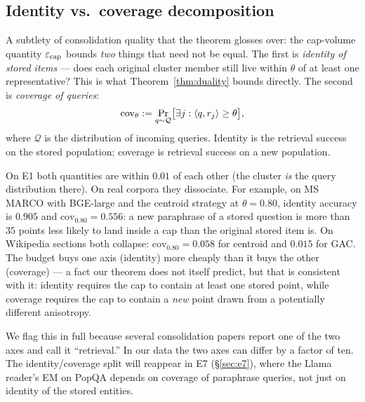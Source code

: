 \subsection{Identity vs.\ coverage decomposition}
\label{sec:identity_coverage}

A subtlety of consolidation quality that the theorem glosses over: the
cap-volume quantity $\varepsilon_{\mathrm{cap}}$ bounds \emph{two} things that
need not be equal. The first is \emph{identity of stored items} --- does
each original cluster member still live within $\theta$ of at least one
representative? This is what Theorem~\ref{thm:duality} bounds directly.
The second is \emph{coverage of queries}:
\begin{equation}
\mathrm{cov}_\theta := \Pr_{q \sim \mathcal{Q}}
\bigl[\exists j : \left\langle q,r_j\right\rangle \geq \theta\bigr],
\label{eq:coverage_def}
\end{equation}
where $\mathcal{Q}$ is the distribution of incoming queries. Identity is
the retrieval success on the stored population; coverage is retrieval
success on a new population.

On E1 both quantities are within $0.01$ of each other (the cluster
\emph{is} the query distribution there). On real corpora they
dissociate. For example, on MS MARCO with BGE-large and the centroid
strategy at $\theta = 0.80$, identity accuracy is $0.905$ and
$\mathrm{cov}_{0.80} = 0.556$: a new paraphrase of a stored question is
more than $35$ points less likely to land inside a cap than the original
stored item is. On Wikipedia sections both collapse: $\mathrm{cov}_{0.80}
= 0.058$ for centroid and $0.015$ for GAC. The budget buys one axis
(identity) more cheaply than it buys the other (coverage) --- a fact
our theorem does not itself predict, but that is consistent with it:
identity requires the cap to contain at least one stored point, while
coverage requires the cap to contain a \emph{new} point drawn from a
potentially different anisotropy.

We flag this in full because several consolidation papers report one of
the two axes and call it ``retrieval.'' In our data the two axes can
differ by a factor of ten. The identity/coverage split will reappear in
E7 (\S\ref{sec:e7}), where the Llama reader's EM on PopQA depends on
coverage of paraphrase queries, not just on identity of the stored
entities.
